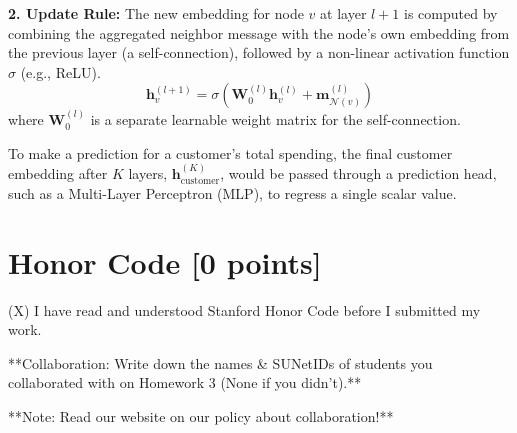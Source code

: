 \documentclass{article}
\numberwithin{figure}{section}
\begin{document}
{	\textbf{2. Update Rule:}
	The new embedding for node $v$ at layer $l+1$ is computed by combining the aggregated neighbor message with the node's own embedding from the previous layer (a self-connection), followed by a non-linear activation function $\sigma$ (e.g., ReLU).
	\[ \mathbf{h}_v^{(l+1)} = \sigma \left( \mathbf{W}_0^{(l)} \mathbf{h}_v^{(l)} + \mathbf{m}_{\mathcal{N}(v)}^{(l)} \right) \]
	where $\mathbf{W}_0^{(l)}$ is a separate learnable weight matrix for the self-connection.
	
	To make a prediction for a customer's total spending, the final customer embedding after $K$ layers, $\mathbf{h}_{\text{customer}}^{(K)}$, would be passed through a prediction head, such as a Multi-Layer Perceptron (MLP), to regress a single scalar value.
}



\section{Honor Code [0 points]}
(X) I have read and understood Stanford Honor Code before I submitted my
work.

**Collaboration: Write down the names \& SUNetIDs of students you collaborated with on Homework 3 (None if you didn’t).**

**Note: Read our website on our policy about collaboration!**
\end{document}
